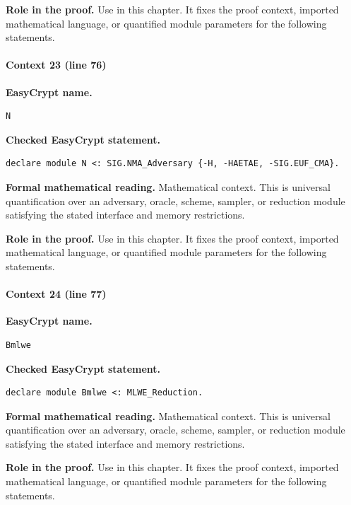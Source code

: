 \noindent\textbf{Role in the proof.}
Use in this chapter. It fixes the proof context, imported mathematical language, or quantified module parameters for the following statements.

\paragraph{Context 23 (line 76)}
\noindent\textbf{EasyCrypt name.}
\begin{lstlisting}[language=EasyCrypt,basicstyle=\ttfamily\scriptsize]
N
\end{lstlisting}
\noindent\textbf{Checked EasyCrypt statement.}
\begin{lstlisting}[language=EasyCrypt,basicstyle=\ttfamily\scriptsize]
declare module N <: SIG.NMA_Adversary {-H, -HAETAE, -SIG.EUF_CMA}.
\end{lstlisting}
\noindent\textbf{Formal mathematical reading.}
Mathematical context. This is universal quantification over an adversary, oracle, scheme, sampler, or reduction module satisfying the stated interface and memory restrictions.

\noindent\textbf{Role in the proof.}
Use in this chapter. It fixes the proof context, imported mathematical language, or quantified module parameters for the following statements.

\paragraph{Context 24 (line 77)}
\noindent\textbf{EasyCrypt name.}
\begin{lstlisting}[language=EasyCrypt,basicstyle=\ttfamily\scriptsize]
Bmlwe
\end{lstlisting}
\noindent\textbf{Checked EasyCrypt statement.}
\begin{lstlisting}[language=EasyCrypt,basicstyle=\ttfamily\scriptsize]
declare module Bmlwe <: MLWE_Reduction.
\end{lstlisting}
\noindent\textbf{Formal mathematical reading.}
Mathematical context. This is universal quantification over an adversary, oracle, scheme, sampler, or reduction module satisfying the stated interface and memory restrictions.

\noindent\textbf{Role in the proof.}
Use in this chapter. It fixes the proof context, imported mathematical language, or quantified module parameters for the following statements.

